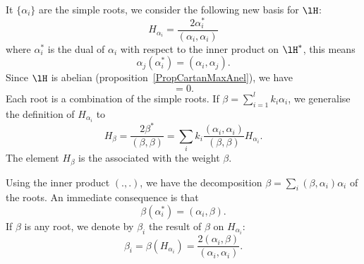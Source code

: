 
It $\{ \alpha_i \}$ are the simple roots, we consider the following new basis for $\lH$:
\begin{equation}
    H_{\alpha_i}=\frac{ 2\alpha_i^* }{ (\alpha_i,\alpha_i) }
\end{equation}
where $\alpha_i^*$ is the dual of $\alpha_i$ with respect to the inner product on \( \lH^*\), this means
\begin{equation}
    \alpha_j(\alpha_i^*)=(\alpha_i,\alpha_j).
\end{equation}
Since \( \lH\) is abelian (proposition~\ref{PropCartanMaxAnel}), we have
\begin{equation}
    [H_{\alpha_i},H_{\alpha_j}]=0.
\end{equation}
Each root is a combination of the simple roots. If $\beta=\sum_{i=1}^lk_i\alpha_i$, we generalise the definition of $H_{\alpha_i}$ to
\begin{equation}
    H_{\beta}=\frac{ 2\beta^* }{ (\beta,\beta) }=\sum_i k_i\frac{ (\alpha_i,\alpha_i) }{ (\beta,\beta) }H_{\alpha_i}.
\end{equation}
The element $H_{\beta}$ is the  associated with the weight $\beta$.

Using the inner product $(.,.)$, we have the decomposition $\beta=\sum_i(\beta,\alpha_i)\alpha_i$ of the roots. An immediate consequence is that
\begin{equation}
    \beta(\alpha_i^*)=(\alpha_i,\beta).
\end{equation}
If $\beta$ is any root, we denote by $\beta_i$ the result of $\beta$ on $H_{\alpha_i}$:
\begin{equation}            \label{EqbetaialphaiH}
    \beta_i=\beta(H_{\alpha_i})=\frac{ 2(\alpha_i,\beta) }{ (\alpha_i,\alpha_i) }.
\end{equation}

